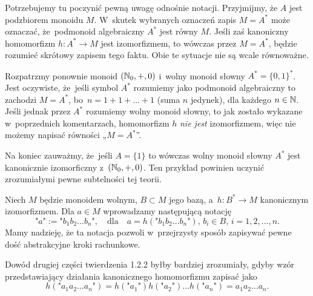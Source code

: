\documentclass[a4paper,11pt]{article}
\begin{document}
\start {} Potrzebujemy tu poczynić pewną uwagę odnośnie notacji.
Przyjmijmy, że $A$ jest podzbiorem monoidu $M$. W~skutek wybranych
oznaczeń zapis $M = A^{ * }$ może oznaczać, że~podmonoid algebraiczny
$A^{ * }$ jest równy $M$. Jeśli zaś kanoniczny homomorfizm
$h : A^{ * } \to M$ jest izomorfizmem, to wówczas przez $M = A^{ * }$,
będzie rozumieć skrótowy zapisem tego faktu. Obie te sytuacje nie są
wcale równoważne.

Rozpatrzmy ponownie monoid $( \mathbb{N}_{ 0 }, +, 0 )$ i~wolny monoid
słowny $A^{ * } = \{ 0, 1 \}^{ * }$. Jest oczywiste, że~jeśli symbol
$A^{ * }$ rozumiemy jako podmonoid algebraiczny to zachodzi
$M = A^{ * }$, bo~$n = 1 + 1 + \ldots + 1$ (suma $n$ jedynek), dla
każdego $n \in \mathbb{N}$. Jeśli jednak przez $A^{ * }$ rozumiemy wolny
monoid słowny, to jak zostało wykazane w~poprzednich komentarzach,
homomorfizm $h$ \textit{nie jest} izomorfizmem, więc nie możemy
napisać równości „$M = A^{ * }$”.

Na koniec zauważmy, że~jeśli $A = \{ 1 \}$ to wówczas wolny monoid
słowny $A^{ * }$ jest kanonicznie izomorficzny
z~$( \mathbb{N}_{ 0 }, +, 0)$. Ten przykład powinien uczynić zrozumiałymi
pewne subtelności tej teorii.

\vspace{\spaceFour}





\start {} Niech $M$ będzie monoidem wolnym, $B \subset M$ jego
bazą, a~$h : B^{ * } \to M$ kanonicznym izomorfizmem. Dla $a \in M$
wprowadzamy następującą notację
\begin{equation}
  \label{eq:Forys-Forys-22}
  \texttt{"} a \texttt{"} :=
  \texttt{"} b_{ 1 } b_{ 2 } \ldots b_{ n } \texttt{"}, \quad
  \textrm{dla} \quad
  a = h( \texttt{"} b_{ 1 } b_{ 2 } \ldots b_{ n } \texttt{"} ), \,
  b_{ i } \in B,\, i = 1, 2, \ldots, n.
\end{equation}
Mamy nadzieję, że ta notacja pozwoli w~przejrzysty sposób zapisywać
pewne dość abstrakcyjne kroki rachunkowe.

\vspace{\spaceFour}





\start {} Dowód drugiej części twierdzenia 1.2.2 byłby bardziej
zrozumiały, gdyby wzór przedstawiający działania kanonicznego
homomorfizmu zapisać jako
\begin{equation}
  \label{eq:Forys-Forys-23}
  h( \texttt{"} a_{ 1 } a_{ 2 } \ldots a_{ n } \texttt{"} ) =
  h( \texttt{"} a_{ 1 } \texttt{"} ) h( \texttt{"} a_{ 2 } \texttt{"} ) \ldots
  h( \texttt{"} a_{ n } \texttt{"} ) = a_{ 1 } a_{ 2 } \ldots a_{ n }.
\end{equation}
\end{document}
